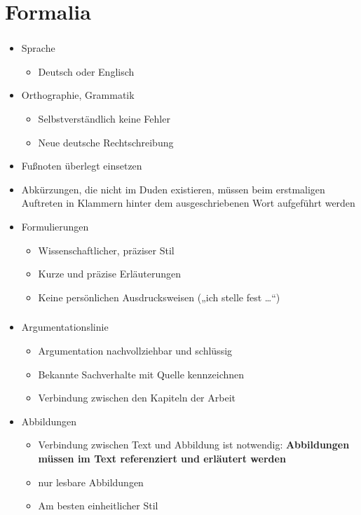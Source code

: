 \documentclass[aspectratio=169]{beamer}
\begin{document}
\section{Formalia}
\begin{frame}
  \frametitle{\insertsection}%
  \framesubtitle{\insertsubsection}%
  \begin{itemize}
   \item Sprache
   \begin{itemize}
    \item Deutsch oder Englisch
   \end{itemize}
   \item Orthographie, Grammatik
   \begin{itemize}
    \item Selbstverständlich keine Fehler
    \item Neue deutsche Rechtschreibung
   \end{itemize}
   \item Fußnoten überlegt einsetzen
   \item Abkürzungen, die nicht im Duden existieren, müssen beim erstmaligen Auftreten in Klammern hinter dem ausgeschriebenen Wort aufgeführt werden
   \item Formulierungen
   \begin{itemize}
    \item Wissenschaftlicher, präziser Stil
    \item Kurze und präzise Erläuterungen
    \item Keine persönlichen Ausdrucksweisen („ich stelle fest …“)
   \end{itemize}
  \end{itemize}
\end{frame}

\begin{frame}
  \frametitle{\insertsection}%
  \framesubtitle{\insertsubsection}%
  \begin{itemize}
   \item Argumentationslinie
   \begin{itemize}
    \item Argumentation nachvollziehbar und schlüssig
    \item Bekannte Sachverhalte mit Quelle kennzeichnen
    \item Verbindung zwischen den Kapiteln der Arbeit
   \end{itemize}
   \item Abbildungen
   \begin{itemize}
    \item Verbindung zwischen Text und Abbildung ist notwendig: \textbf{Abbildungen müssen im Text referenziert und erläutert werden}
    \item nur lesbare Abbildungen
    \item Am besten einheitlicher Stil
   \end{itemize}
  \end{itemize}
\end{frame}
\end{document}

